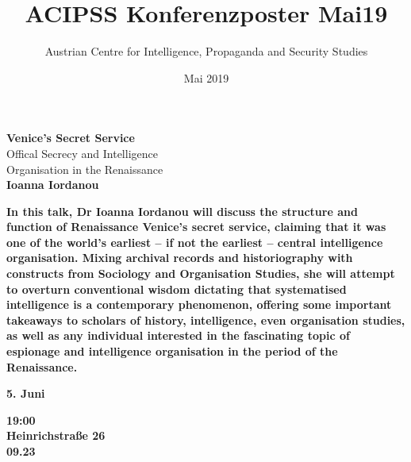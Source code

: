 \documentclass[a4paper,20pt]{article}
\title{ACIPSS Konferenzposter Mai19}
\author{Austrian Centre for Intelligence, Propaganda and Security Studies}
\date{Mai 2019}
\newcommand{\crosshairs}{{\color{acipssbeige!60}\fontsize{120pt}{40pt}\selectfont\faCrosshairs}}
\def \factor {2.5}
\begin{document}

\vspace{3cm}
\begin{minipage}[t]{0.68\textwidth}
{\fontsize{30pt}{30pt}\selectfont\colorbox{acipssbeige!30}{\textbf{Venice's Secret Service}}}\\
{\fontsize{20pt}{20pt}\selectfont\colorbox{acipssbeige!30}{Offical Secrecy and Intelligence}}\\
{\fontsize{20pt}{20pt}\selectfont\colorbox{acipssbeige!30}{Organisation in the Renaissance}}\\
{\fontsize{20pt}{20pt}\selectfont\colorbox{acipssbeige!30}{\textbf{Ioanna Iordanou}}}
\end{minipage}\hfill\hspace{1cm}
\begin{minipage}[t]{0.29\textwidth}
\vspace{1cm}
\end{minipage}\hfill
\vspace{1em}


\bigskip

\vspace{1em}

\begin{minipage}[t]{0.55\textwidth}
\color{acipssbeige!10} \bf
\large
In this talk, Dr Ioanna Iordanou will discuss the structure and function of Renaissance Venice’s secret service, claiming that it was one of the world’s earliest – if not the earliest – central intelligence organisation. Mixing archival records and historiography with constructs from Sociology and Organisation Studies, she will attempt to overturn conventional wisdom dictating that systematised intelligence is a contemporary phenomenon, offering some important takeaways to scholars of history, intelligence, even organisation studies, as well as any individual interested in the fascinating topic of espionage and intelligence organisation in the period of the Renaissance.
\medskip

\end{minipage}\hfill\hspace{2em}\begin{minipage}[t]{0.27\textwidth}\vspace{1em}
\Large

 
 {\fontsize{30pt}{30pt}\selectfont\colorbox{acipssbeige!30}{\textbf{5. Juni}}}\\
 \smallskip
 
  {\fontsize{30pt}{30pt}\selectfont\colorbox{acipssbeige!30}{\textbf{19:00}}}\\

{\fontsize{15pt}{15pt}\selectfont\colorbox{acipssblue!70}{\textbf{Heinrichstraße 26}}}\\
{\fontsize{20pt}{20pt}\selectfont\colorbox{acipssblue!70}{\textbf{09.23}}}\\

\medskip

\end{minipage}\hfill
\end{document}
